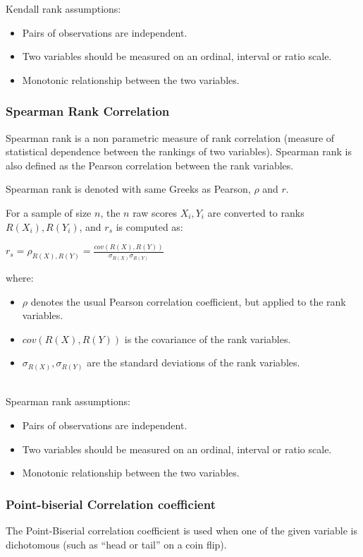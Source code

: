 \documentclass{article}
\begin{document}
Kendall rank assumptions:
\begin{itemize}
    \item Pairs of observations are independent.
    \item Two variables should be measured on an ordinal, interval or ratio scale.
    \item Monotonic relationship between the two variables.
\end{itemize}

\subsubsection{Spearman Rank Correlation}
Spearman rank is a non parametric measure of rank correlation (measure of statistical dependence between the rankings of two variables). 
Spearman rank is also defined as the Pearson correlation between the rank variables.

Spearman rank is denoted with same Greeks as Pearson, $\rho$ and $r$.

For a sample of size $n$, the $n$ raw scores $ X_{i},Y_{i}$ are converted to ranks ${R} ({X_{i}}), {R} ({Y_{i}})$, and $ r_{s}$ is computed as:

$\displaystyle r_{s}=\rho _{{R} (X), {R} (Y)}={\frac { {cov} ( {R} (X),{R} (Y))}{\sigma _{ {R} (X)}\sigma _{{R} (Y)}}}$

where:
\begin{itemize}
    \item $\rho$ denotes the usual Pearson correlation coefficient, but applied to the rank variables.
    \item ${cov} ( {R} (X),{R} (Y))$  is the covariance of the rank variables.
    \item $\sigma _{ {R} (X)}, \sigma _{{R} (Y)}$ are the standard deviations of the rank variables.
\end{itemize}

\mbox{}\\

Spearman rank assumptions:
\begin{itemize}
    \item Pairs of observations are independent.
    \item Two variables should be measured on an ordinal, interval or ratio scale.
    \item Monotonic relationship between the two variables.
\end{itemize}

\subsubsection{Point-biserial Correlation coefficient}
The Point-Biserial correlation coefficient is used when one of the given variable is dichotomous (such as “head or tail” on a coin flip).
\end{document}
